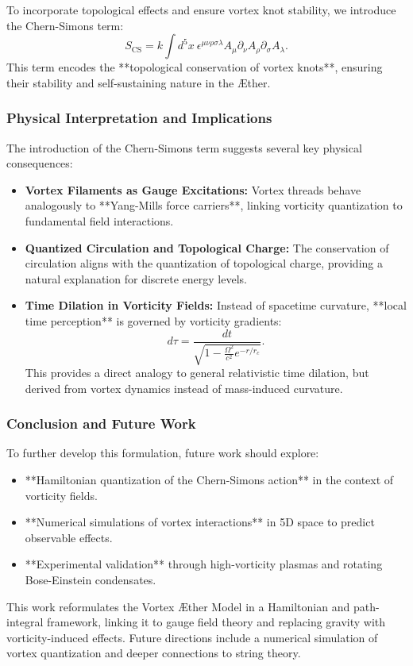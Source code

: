 To incorporate topological effects and ensure vortex knot stability, we introduce the Chern-Simons term:
\begin{equation}
    S_{\text{CS}} = k \int d^5x \ \epsilon^{\mu\nu\rho\sigma\lambda} A_{\mu} \partial_{\nu} A_{\rho} \partial_{\sigma} A_{\lambda}.
\end{equation}
This term encodes the **topological conservation of vortex knots**, ensuring their stability and self-sustaining nature in the \AE ther.

\subsubsection*{Physical Interpretation and Implications}

The introduction of the Chern-Simons term suggests several key physical consequences:
\begin{itemize}
    \item \textbf{Vortex Filaments as Gauge Excitations:} Vortex threads behave analogously to **Yang-Mills force carriers**, linking vorticity quantization to fundamental field interactions.
    \item \textbf{Quantized Circulation and Topological Charge:} The conservation of circulation aligns with the quantization of topological charge, providing a natural explanation for discrete energy levels.
    \item \textbf{Time Dilation in Vorticity Fields:} Instead of spacetime curvature, **local time perception** is governed by vorticity gradients:
    \begin{equation}
        d\tau = \frac{dt}{\sqrt{1 - \frac{\Omega^2}{c^2} e^{-r/r_c}}}.
    \end{equation}
    This provides a direct analogy to general relativistic time dilation, but derived from vortex dynamics instead of mass-induced curvature.
\end{itemize}

\subsubsection*{Conclusion and Future Work}
To further develop this formulation, future work should explore:
\begin{itemize}
    \item **Hamiltonian quantization of the Chern-Simons action** in the context of vorticity fields.
    \item **Numerical simulations of vortex interactions** in 5D space to predict observable effects.
    \item **Experimental validation** through high-vorticity plasmas and rotating Bose-Einstein condensates.
\end{itemize}

This work reformulates the Vortex Æther Model in a Hamiltonian and path-integral framework, linking it to gauge field theory and replacing gravity with vorticity-induced effects. Future directions include a numerical simulation of vortex quantization and deeper connections to string theory.

